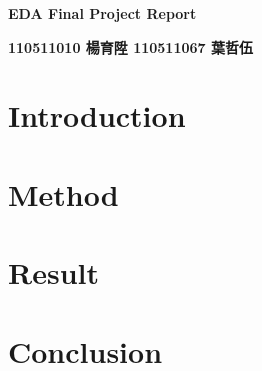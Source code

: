 \documentclass[12pt]{article}
\begin{document}
\begin{center}
    \huge \textbf{EDA Final Project Report}
    
    \vspace{10pt}
    
    \large \textbf{110511010 楊育陞 110511067 葉哲伍}
\end{center}

\section{Introduction}

\section{Method}

\section{Result}

\section{Conclusion}
\end{document}
